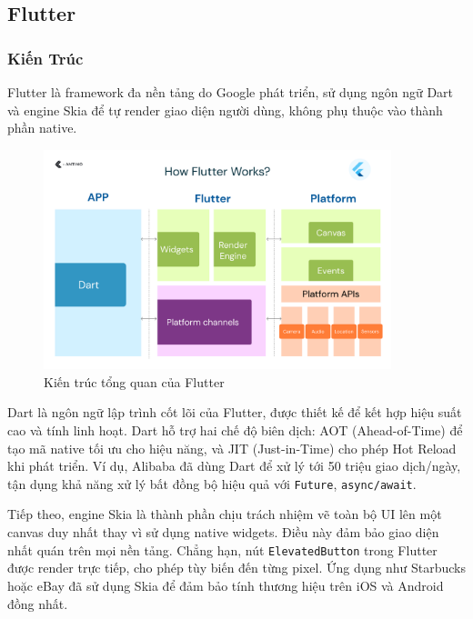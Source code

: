 \subsection{Flutter}
\renewcommand{\labelitemi}{--}    
\subsubsection{Kiến Trúc}

\hspace*{1.5em}Flutter là framework đa nền tảng do Google phát triển, sử dụng ngôn ngữ Dart và engine Skia để tự render giao diện người dùng, không phụ thuộc vào thành phần native.

\begin{figure}[H]
    \centering
    \includegraphics[width=0.9\textwidth]{images/flutter.png}
    \caption{Kiến trúc tổng quan của Flutter}
\end{figure}

Dart là ngôn ngữ lập trình cốt lõi của Flutter, được thiết kế để kết hợp hiệu suất cao và tính linh hoạt.  
Dart hỗ trợ hai chế độ biên dịch: AOT (Ahead-of-Time) để tạo mã native tối ưu cho hiệu năng, và JIT (Just-in-Time) cho phép Hot Reload khi phát triển.  
Ví dụ, Alibaba đã dùng Dart để xử lý tới 50 triệu giao dịch/ngày, tận dụng khả năng xử lý bất đồng bộ hiệu quả với \texttt{Future}, \texttt{async/await}.

Tiếp theo, engine Skia là thành phần chịu trách nhiệm vẽ toàn bộ UI lên một canvas duy nhất thay vì sử dụng native widgets.  
Điều này đảm bảo giao diện nhất quán trên mọi nền tảng.  
Chẳng hạn, nút \texttt{ElevatedButton} trong Flutter được render trực tiếp, cho phép tùy biến đến từng pixel.  
Ứng dụng như Starbucks hoặc eBay đã sử dụng Skia để đảm bảo tính thương hiệu trên iOS và Android đồng nhất.

